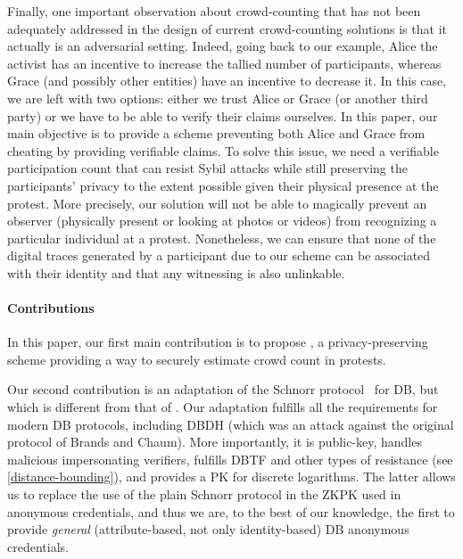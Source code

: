 Finally, one important observation about crowd-counting that has not been adequately addressed in the design of current crowd-counting solutions is that it actually is an adversarial setting. 
Indeed, going back to our example, Alice the activist has an incentive to increase the tallied number of participants, whereas Grace (and possibly other entities) have an incentive to decrease it.
In this case, we are left with two options: either we trust Alice or Grace (or another third party) or we have to be able to verify their claims ourselves.
In this paper, our main objective is to provide a scheme preventing both Alice 
and Grace from cheating by providing verifiable claims.
To solve this issue, we need a verifiable participation count that can resist Sybil attacks while still preserving the participants' privacy to the extent possible given their physical presence at the protest. 
More precisely, our solution will not be able to magically prevent an observer (physically present or looking at photos or videos) from recognizing a particular individual at a protest. 
Nonetheless, we can ensure that none of the digital traces generated by a participant due to our scheme can be associated with their identity and that any witnessing is also unlinkable.

\paragraph*{Contributions}

In this paper, our first main contribution is to propose \CROCUS, a privacy-preserving scheme providing a way to securely estimate crowd count in protests.

Our second contribution is an adaptation of the Schnorr protocol~\cite{Schnorr} for \ac{DB}, but which is different from that of \textcite{DistanceBounding}.
Our adaptation fulfills all the requirements for modern \ac{DB} protocols, including \ac{DBDH} (which was an attack against the original protocol of Brands and Chaum).
More importantly, it is public-key, handles malicious impersonating verifiers, fulfills \ac{DBTF} and other types of resistance (see \cref{distance-bounding}), and provides a \ac{PK} for discrete logarithms.
The latter allows us to replace the use of the plain Schnorr protocol in the \ac{ZKPK} used in anonymous credentials,
and thus we are, to the best of our knowledge, the first to provide \emph{general} (\ie attribute-based, not only identity-based) \ac{DB} anonymous credentials.


